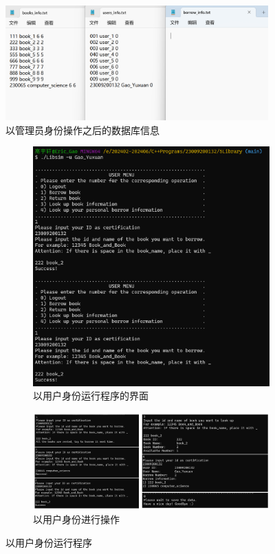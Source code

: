 \documentclass{ctexart}
\begin{document}
    \begin{figure}[!htbp] %
        \centering
        \includegraphics[width=0.9\textwidth]{src/admin_result.png}
        \caption{以管理员身份操作之后的数据库信息}    
    \end{figure}
    
    \begin{figure}[!htbp]
        \centering
        \begin{subfigure}{0.34\textwidth}
            \includegraphics[width=\linewidth]{src/user01.png}
            \caption{以用户身份运行程序的界面}
        \end{subfigure}
        \begin{subfigure}{0.64\textwidth}
            \includegraphics[width=\linewidth]{src/user00.png}
            \caption{以用户身份进行操作}
        \end{subfigure}
        \caption{以用户身份运行程序}
    \end{figure}
    
\end{document}
